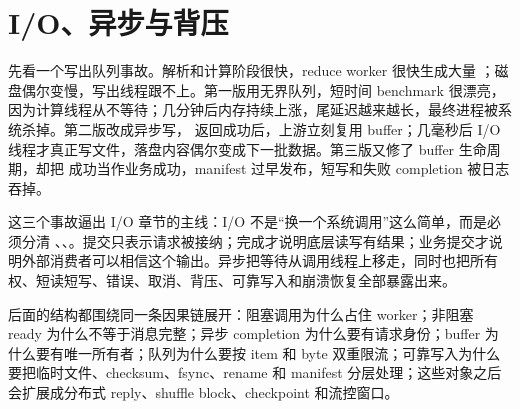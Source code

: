 \chapter{I/O、异步与背压}

先看一个写出队列事故。解析和计算阶段很快，reduce worker 很快生成大量 ；磁盘偶尔变慢，写出线程跟不上。第一版用无界队列，短时间 benchmark 很漂亮，因为计算线程从不等待；几分钟后内存持续上涨，尾延迟越来越长，最终进程被系统杀掉。第二版改成异步写， 返回成功后，上游立刻复用 buffer；几毫秒后 I/O 线程才真正写文件，落盘内容偶尔变成下一批数据。第三版又修了 buffer 生命周期，却把  成功当作业务成功，manifest 过早发布，短写和失败 completion 被日志吞掉。

这三个事故逼出 I/O 章节的主线：I/O 不是“换一个系统调用”这么简单，而是必须分清 、、。提交只表示请求被接纳；完成才说明底层读写有结果；业务提交才说明外部消费者可以相信这个输出。异步把等待从调用线程上移走，同时也把所有权、短读短写、错误、取消、背压、可靠写入和崩溃恢复全部暴露出来。

后面的结构都围绕同一条因果链展开：阻塞调用为什么占住 worker；非阻塞 ready 为什么不等于消息完整；异步 completion 为什么要有请求身份；buffer 为什么要有唯一所有者；队列为什么要按 item 和 byte 双重限流；可靠写入为什么要把临时文件、checksum、fsync、rename 和 manifest 分层处理；这些对象之后会扩展成分布式 reply、shuffle block、checkpoint 和流控窗口。

